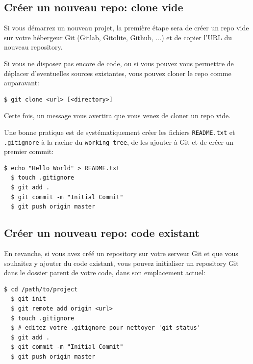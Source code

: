 \documentclass{../../common/tufte-latex/tufte-handout}
\begin{document}
\subsection{Créer un nouveau repo: clone vide}

Si vous démarrez un nouveau projet, la première étape sera de créer un repo vide sur votre hébergeur Git (Gitlab, Gitolite, Github, ...) et de copier l'URL du nouveau repository.

Si vous ne disposez pas encore de code, ou si vous pouvez vous permettre de déplacer d'eventuelles sources existantes, vous pouvez cloner le repo comme auparavant:

\begin{lstlisting}[style=BashInputStyle]
  $ git clone <url> [<directory>]
\end{lstlisting}

Cette fois, un message vous avertira que vous venez de cloner un repo vide.

Une bonne pratique est de systématiquement créer les fichiers \texttt{README.txt} et \texttt{.gitignore} à la racine du \texttt{working tree}, de les ajouter à Git et de créer un premier commit: 

\begin{lstlisting}[style=BashInputStyle]
  $ echo "Hello World" > README.txt
  $ touch .gitignore
  $ git add .
  $ git commit -m "Initial Commit"
  $ git push origin master
\end{lstlisting}

\subsection{Créer un nouveau repo: code existant}

En revanche, si vous avez créé un repository sur votre serveur Git et que vous souhaitez y ajouter du code existant, vous pouvez initialiser un repository Git dans le dossier parent de votre code, dans son emplacement actuel:


\begin{lstlisting}[style=BashInputStyle]
  $ cd /path/to/project
  $ git init
  $ git remote add origin <url>
  $ touch .gitignore
  $ # editez votre .gitignore pour nettoyer 'git status'
  $ git add .
  $ git commit -m "Initial Commit"
  $ git push origin master
\end{lstlisting}
\end{document}
